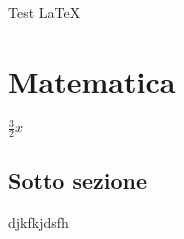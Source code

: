 \documentclass{article}
\begin{document}
Test \LaTeX


\section{Matematica}

$\frac{3}{2}x$


\subsection{Sotto sezione}

djkfkjdsfh
\end{document}
